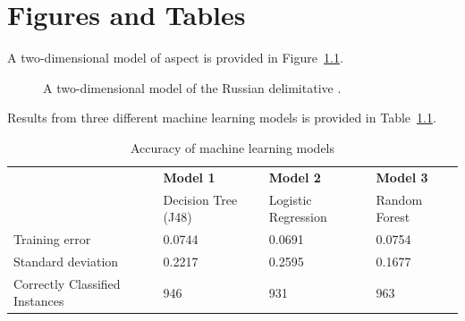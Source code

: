 \chapter{Figures and Tables\label{chap:figsandtabs}}

\lipsum[41]
A two-dimensional model of aspect is provided in
Figure~\ref{fig:2d}.

\lipsum[42]

\begin{figure}[h]
	\centering\label{fig:2d}
	\caption[The Russian delimitative in two dimensions]{A two-dimensional
	  model of the Russian delimitative \cite[79--80]{Croft:2012aa}.}
\end{figure}

\lipsum[43-46]
Results from three different machine learning models is provided in
Table~\ref{tab:ml}.

\lipsum[47]

\begin{table}[h]
	\centering\label{tab:ml}
	\caption{Accuracy of machine learning models}\vspace{1ex}
	\begin{tabular}{@{}llll@{}}
	 & {\bf Model 1} & {\bf Model 2} & {\bf Model 3} \\
	 & Decision Tree (J48) & Logistic Regression & Random Forest \\ \midrule
	 Training error & 0.0744 & 0.0691 & 0.0754 \\
	 Standard deviation & 0.2217 & 0.2595 & 0.1677 \\
	 Correctly Classified Instances & 946 & 931 & 963 \\
	\end{tabular}
\end{table}

\lipsum[48-52]

